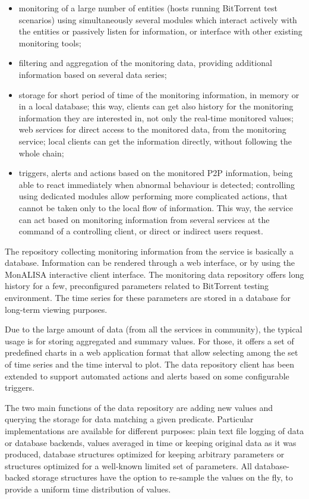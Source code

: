 \begin{itemize}
  \item monitoring of a large number of entities (hosts running BitTorrent
  test scenarios) using simultaneously several modules which interact actively
  with the entities or passively listen for information, or interface with
  other existing monitoring tools;
  \item filtering and aggregation of the monitoring data, providing additional
  information based on several data series;
  \item storage for short period of time of the monitoring information, in
  memory or in a local database; this way, clients can get also history for
  the monitoring information they are interested in, not only the real-time
  monitored values; web services for direct access to the monitored data, from
  the monitoring service; local clients can get the information directly,
  without following the whole chain;
  \item triggers, alerts and actions based on the monitored P2P information,
  being able to react immediately when abnormal behaviour is detected;
  controlling using dedicated modules allow performing more complicated
  actions, that cannot be taken only to the local flow of information. This
  way, the service can act based on monitoring information from several
  services at the command of a controlling client, or direct or indirect users
  request.
\end{itemize}

The repository collecting monitoring information from the service is basically
a database. Information can be rendered through a web interface, or by using
the MonALISA interactive client interface. The monitoring data repository
offers long history for a few, preconfigured parameters related to BitTorrent
testing environment. The time series for these parameters are stored in a
database for long-term viewing purposes.

Due to the large amount of data (from all the services in community), the
typical usage is for storing aggregated and summary values. For those, it
offers a set of predefined charts in a web application format that allow
selecting among the set of time series and the time interval to plot. The data
repository client has been extended to support automated actions and alerts
based on some configurable triggers.

The two main functions of the data repository are adding new values and
querying the storage for data matching a given predicate. Particular
implementations are available for different purposes: plain text file logging
of data or database backends, values averaged in time or keeping original data
as it was produced, database structures optimized for keeping arbitrary
parameters or structures optimized for a well-known limited set of parameters.
All database-backed storage structures have the option to re-sample the values
on the fly, to provide a uniform time distribution of values.

